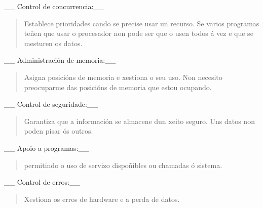 \_\_ Control de concurrencia:\_\_

\begin{quote}
Establece prioridades cando se precise usar un recurso. Se varios
programas teñen que usar o procesador non pode ser que o usen todos á
vez e que se mesturen os datos.
\end{quote}

\_\_ Administración de memoria:\_\_

\begin{quote}
Asigna posicións de memoria e xestiona o seu uso. Non necesito
preocuparme das posicións de memoria que estou ocupando.
\end{quote}

\_\_ Control de seguridade:\_\_

\begin{quote}
Garantiza que a información se almacene dun xeito seguro. Uns datos non
poden pisar ós outros.
\end{quote}

\_\_ Apoio a programas:\_\_

\begin{quote}
permitindo o uso de servizo dispoñibles ou chamadas ó sistema.
\end{quote}

\_\_ Control de erros:\_\_

\begin{quote}
Xestiona os erros de hardware e a perda de datos.
\end{quote}
